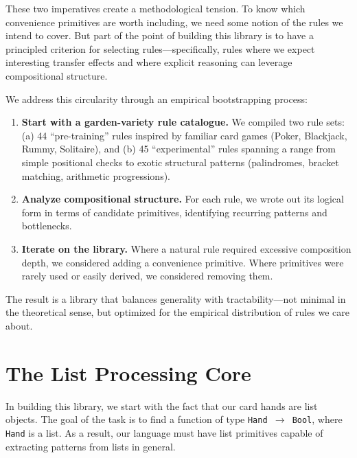 \documentclass[11pt]{article}
\begin{document}
These two imperatives create a methodological tension. To know which convenience primitives are worth including, we need some notion of the rules we intend to cover. But part of the point of building this library is to have a principled criterion for selecting rules---specifically, rules where we expect interesting transfer effects and where explicit reasoning can leverage compositional structure.

We address this circularity through an empirical bootstrapping process:

\begin{enumerate}
    \item \textbf{Start with a garden-variety rule catalogue.} We compiled two rule sets: (a) 44 ``pre-training'' rules inspired by familiar card games (Poker, Blackjack, Rummy, Solitaire), and (b) 45 ``experimental'' rules spanning a range from simple positional checks to exotic structural patterns (palindromes, bracket matching, arithmetic progressions).
    
    \item \textbf{Analyze compositional structure.} For each rule, we wrote out its logical form in terms of candidate primitives, identifying recurring patterns and bottlenecks.
    
    \item \textbf{Iterate on the library.} Where a natural rule required excessive composition depth, we considered adding a convenience primitive. Where primitives were rarely used or easily derived, we considered removing them.
\end{enumerate}

The result is a library that balances generality with tractability---not minimal in the theoretical sense, but optimized for the empirical distribution of rules we care about.

\section{The List Processing Core}

In building this library, we start with the fact that our card hands are list objects. The goal of the task is to find a function of type \texttt{Hand $\to$ Bool}, where \texttt{Hand} is a list. As a result, our language must have list primitives capable of extracting patterns from lists in general.
\end{document}
